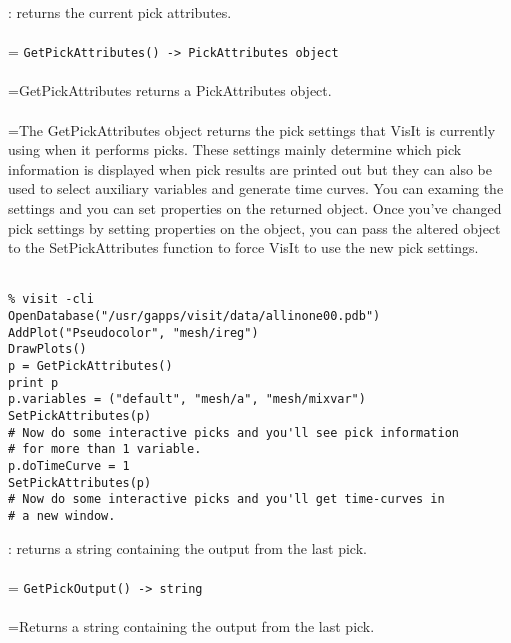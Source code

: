 \documentclass[10pt,a4paper]{report}
\begin{document}
{}
: returns the current pick attributes.\\[-3mm]

 \\ 
\hangindent=\parindent 
\verb!GetPickAttributes() -> PickAttributes object!\\ [-3mm]

 \\ 
\hangindent=\parindent GetPickAttributes returns a PickAttributes object. \\[-3mm] 

 \\ 
\hangindent=\parindent The GetPickAttributes object returns the pick settings that VisIt is currently using when it performs picks. These settings mainly determine which pick information is displayed when pick results are printed out but they can also be used to select auxiliary variables and generate time curves. You can examing the settings and you can set properties on the returned object. Once you've changed pick settings by setting properties on the object, you can pass the altered object to the SetPickAttributes function to force VisIt to use the new pick settings. \\[-3mm] 

\\[-6mm]
\begin{verbatim}% visit -cli
OpenDatabase("/usr/gapps/visit/data/allinone00.pdb")
AddPlot("Pseudocolor", "mesh/ireg")
DrawPlots()
p = GetPickAttributes()
print p
p.variables = ("default", "mesh/a", "mesh/mixvar")
SetPickAttributes(p)
# Now do some interactive picks and you'll see pick information
# for more than 1 variable.
p.doTimeCurve = 1
SetPickAttributes(p)
# Now do some interactive picks and you'll get time-curves in 
# a new window.
\end{verbatim}
\newpage


{}
: returns a string containing the output from the last pick.\\[-3mm]

 \\ 
\hangindent=\parindent 
\verb!GetPickOutput() -> string!\\ [-3mm]

 \\ 
\hangindent=\parindent Returns a string containing the output from the last pick. \\[-3mm] 
\end{document}
